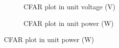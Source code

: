 \documentclass[12pt,DIV14,BCOR12mm,a4paper,footinclude=false,headinclude,parskip=half-,twoside,openright,cleardoublepage=empty,toc=index,bibliography=totoc,listof=totoc]{scrreprt}
\numberwithin{equation}{chapter}
\begin{document}
\begin{figure}[t]
    \centering
    \begin{subfigure}{0.45\textwidth}
        \centering
        \caption{CFAR plot in unit voltage (V)}
        \label{1c_empty_V}
    \end{subfigure}\hspace{0.5cm}
    \begin{subfigure}{0.45\textwidth}
        \centering
        \caption{CFAR plot in unit power (W)}
        \label{1c_empty}
    \end{subfigure}

\end{figure}
\end{document}
